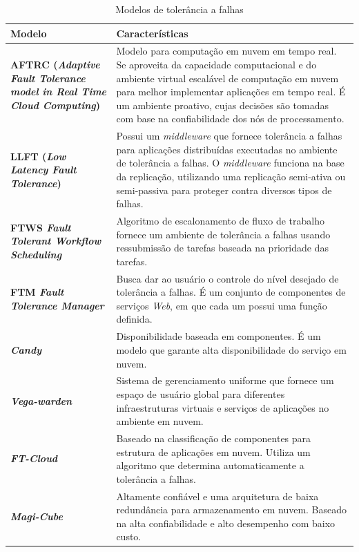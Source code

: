 \documentclass[
	12pt,				%
	oneside,			%
	a4paper,			%
	chapter=TITLE,		%
	english,			%
	french,				%
	spanish,			%
	brazil				%
	]{abntex2}
\begin{document}
\begin{table}[ht]
    \centering
    \ABNTEXchapterfont
    \caption{Modelos de tolerância a falhas}
    \begin{tabular}{|m{3.5cm}|m{12.0cm}|}
    \hline
     \textbf{Modelo} & \textbf{Características} \\
     \hline
     \hline
     \textbf{AFTRC (\emph{Adaptive Fault Tolerance model in Real Time Cloud Computing})} & Modelo para computação em nuvem em tempo real. Se aproveita da capacidade computacional e do ambiente virtual escalável de computação em nuvem para melhor implementar aplicações em tempo real. É um ambiente proativo, cujas decisões são tomadas com base na confiabilidade dos nós de processamento. \\
     \hline
     \textbf{LLFT (\emph{Low Latency Fault Tolerance})} &  Possui um \emph{middleware} que fornece tolerância a falhas para aplicações distribuídas executadas no ambiente de tolerância a falhas. O \emph{middleware} funciona na base da replicação, utilizando uma replicação semi-ativa ou semi-passiva para proteger contra diversos tipos de falhas. \\
     \hline
     \textbf{FTWS \emph{Fault Tolerant Workflow Scheduling}} & Algoritmo de escalonamento de fluxo de trabalho fornece um ambiente de tolerância a falhas usando ressubmissão de tarefas baseada na prioridade das tarefas.  \\
     \hline
     \textbf{FTM \emph{Fault Tolerance Manager}}&  Busca dar ao usuário o controle do nível desejado de tolerância a falhas. É um conjunto de componentes de serviços \emph{Web}, em que cada um possui uma função definida. \\
     \hline
     \textbf{\emph{Candy}} & Disponibilidade baseada em componentes. É um modelo que garante alta disponibilidade do serviço em nuvem. \\
     \hline
     \textbf{\emph{Vega-warden}} & Sistema de gerenciamento uniforme que fornece um espaço de usuário global para diferentes infraestruturas virtuais e serviços de aplicações no ambiente em nuvem.\\
     \hline
     \textbf{\emph{FT-Cloud}} & Baseado na classificação de componentes para estrutura de aplicações em nuvem. Utiliza um algoritmo que determina automaticamente a tolerância a falhas. \\
     \hline
     \textbf{\emph{Magi-Cube}} & Altamente confiável e uma arquitetura de baixa redundância para armazenamento em nuvem. Baseado na alta confiabilidade e alto desempenho com baixo custo. \\
     \hline
     \end{tabular}
     \label{tab:modelostol}
\end{table}
\end{document}
